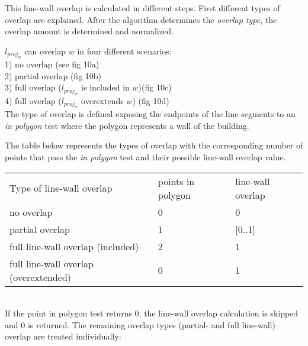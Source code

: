 \documentclass[10pt]{article}
\begin{document}
	This line-wall overlap is calculated in different steps.
	First different types of overlap are explained. After the algorithm
	determines the \emph{overlap type}, the overlap amount is determined and
	normalized.

	$l_{proj_w}$ can overlap $w$ in four different scenarios:\\
		1) no overlap (see fig 10a)\\
		2) partial overlap (fig 10b)\\
		3) full overlap ($l_{proj_w}$ is included in $w$)(fig 10c)\\
		4) full overlap ($l_{proj_w}$ overextends $w$) (fig 10d)\\

	The type of overlap is defined exposing the endpoints of the line
	segments to an \emph{in polygon} test where the polygon represents a 
	wall of the building.

	The table below represents the types of overlap with the corresponding number of points
	that pass the \emph{in polygon} test and their possible line-wall overlap
	value.\\ 
	\begin{tabular}{|l|l|l|}
	Type of line-wall overlap 			&	points in polygon 			& line-wall overlap \\
	no overlap					&	0					& 0		\\
	partial overlap 				&	1					& [0..1]	\\
	full line-wall overlap (included)		&	2					& 1		\\
	full line-wall overlap (overextended)		&  	0					& 1 		\\
	\end{tabular}
	\\

	If the point in polygon test returns 0, the line-wall overlap calculation
	is skipped and 0 is returned. The remaining overlap types (partial- and full
	line-wall) overlap are treated individually:\\

\end{document}
